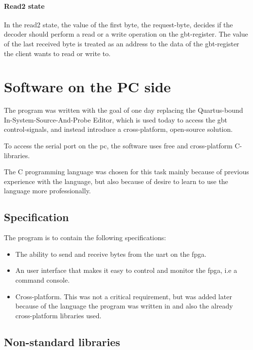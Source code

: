 \documentclass[main.tex]{subfiles}
\begin{document}
\subsubsection{Read2 state}
  In the read2 state, the value of the first byte, the request-byte, decides if the decoder should perform a read or a write operation on the gbt-register. The value of the last received byte is treated as an address to the data of the gbt-register the client wants to read or write to.  




\chapter{Software on the PC side} \label{chap:software}

The program was written with the goal of one day replacing the Quartus-bound In-System-Source-And-Probe Editor, which is used today to access the \gls{gbt} control-signals, and instead introduce a cross-platform, open-source solution.

To access the serial port on the \acrshort{pc}, the software uses free and cross-platform C-libraries.

The C programming language was chosen for this task mainly because of previous experience with the language, but also because of desire to learn to use the language more professionally. 

\section{Specification}

The program is to contain the following specifications:\\
\begin{itemize} \setlength{\itemsep}{10pt}
\item The ability to send and receive bytes from the \gls{uart} on the \gls{fpga}. 
\item An user interface that makes it easy to control and monitor the \gls{fpga}, i.e a command console.
\item Cross-platform. This was not a critical requirement, but was added later because of the language the program was written in and also the already cross-platform libraries used. 
\end{itemize}

\section{Non-standard libraries}
\end{document}
